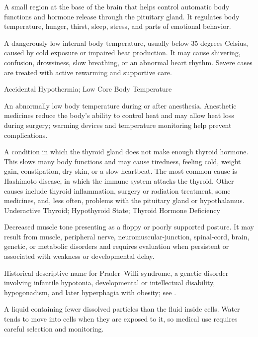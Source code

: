  A small region at the base of the brain that helps control automatic body functions and hormone release through the pituitary gland. It regulates body temperature, hunger, thirst, sleep, stress, and parts of emotional behavior.

 A dangerously low internal body temperature, usually below 35 degrees Celsius, caused by cold exposure or impaired heat production. It may cause shivering, confusion, drowsiness, slow breathing, or an abnormal heart rhythm. Severe cases are treated with active rewarming and supportive care.

\synonyms
Accidental Hypothermia; Low Core Body Temperature

 An abnormally low body temperature during or after anesthesia. Anesthetic medicines reduce the body’s ability to control heat and may allow heat loss during surgery; warming devices and temperature monitoring help prevent complications.

 A condition in which the thyroid gland does not make enough thyroid hormone. This slows many body functions and may cause tiredness, feeling cold, weight gain, constipation, dry skin, or a slow heartbeat. The most common cause is Hashimoto disease, in which the immune system attacks the thyroid. Other causes include thyroid inflammation, surgery or radiation treatment, some medicines, and, less often, problems with the pituitary gland or hypothalamus.
\synonyms
Underactive Thyroid; Hypothyroid State; Thyroid Hormone Deficiency

 Decreased muscle tone presenting as a
floppy or poorly supported posture. It may result from muscle, peripheral nerve,
neuromuscular-junction, spinal-cord, brain, genetic, or metabolic disorders and requires
evaluation when persistent or associated with weakness or developmental delay.

 Historical descriptive name for Prader--Willi syndrome, a genetic disorder involving infantile hypotonia, developmental or intellectual disability, hypogonadism, and later hyperphagia with obesity; see .

 A liquid containing fewer dissolved particles than the fluid inside cells. Water tends to move into cells when they are exposed to it, so medical use requires careful selection and monitoring.

